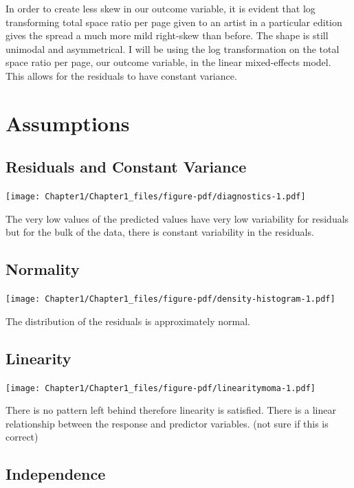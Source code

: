 \documentclass[
  letterpaper,
  DIV=11,
  numbers=noendperiod]{scrreprt}
\begin{document}
In order to create less skew in our outcome variable, it is evident that
log transforming total space ratio per page given to an artist in a
particular edition gives the spread a much more mild right-skew than
before. The shape is still unimodal and asymmetrical. I will be using
the log transformation on the total space ratio per page, our outcome
variable, in the linear mixed-effects model. This allows for the
residuals to have constant variance.

\hypertarget{assumptions}{%
\section{Assumptions}\label{assumptions}}

\hypertarget{residuals-and-constant-variance}{%
\subsection{Residuals and Constant
Variance}\label{residuals-and-constant-variance}}

\texttt{[image: Chapter1/Chapter1\_files/figure-pdf/diagnostics-1.pdf]}

The very low values of the predicted values have very low variability
for residuals but for the bulk of the data, there is constant
variability in the residuals.

\hypertarget{normality}{%
\subsection{Normality}\label{normality}}

\texttt{[image: Chapter1/Chapter1\_files/figure-pdf/density-histogram-1.pdf]}

The distribution of the residuals is approximately normal.

\hypertarget{linearity}{%
\subsection{Linearity}\label{linearity}}

\texttt{[image: Chapter1/Chapter1\_files/figure-pdf/linearitymoma-1.pdf]}

There is no pattern left behind therefore linearity is satisfied. There
is a linear relationship between the response and predictor variables.
(not sure if this is correct)

\hypertarget{independence}{%
\subsection{Independence}\label{independence}}
\end{document}
